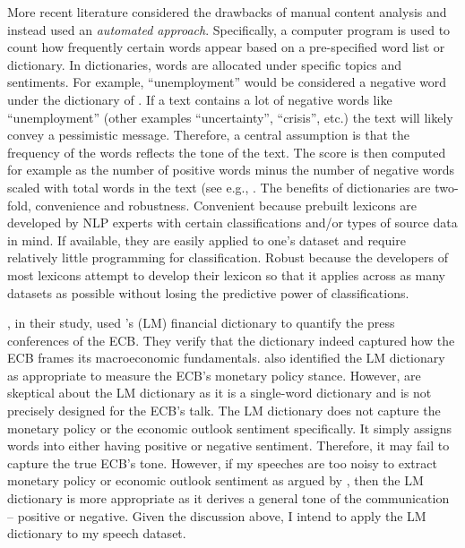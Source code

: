 More recent literature considered the drawbacks of manual content analysis and instead used an \textit{automated approach}. Specifically, a computer program is used to count how frequently certain words appear based on a pre-specified word list or dictionary. In dictionaries, words are allocated under specific topics and sentiments. For example, “unemployment” would be considered a negative word under the dictionary of \textcite{loughran2011}. If a text contains a lot of negative words like “unemployment” (other examples “uncertainty”, “crisis”, etc.) the text will likely convey a pessimistic message. Therefore, a central assumption is that the frequency of the words reflects the tone of the text. The score is then computed for example as the number of positive words minus the number of negative words scaled with total words in the text (see e.g., \cite{picault2017,baranowski2021}. The benefits of dictionaries are two-fold, convenience and robustness. Convenient because prebuilt lexicons are developed by NLP experts with certain classifications and/or types of source data in mind. If available, they are easily applied to one’s dataset and require relatively little programming for classification. Robust because the developers of most lexicons attempt to develop their lexicon so that it applies across as many datasets as possible without losing the predictive power of classifications.


\textcite{schmeling2019}, in their study, used \textcite{loughran2011}’s (LM) financial dictionary to quantify the press conferences of the ECB. They verify that the dictionary indeed captured how the ECB frames its macroeconomic fundamentals. \textcite{baranowski2021} also identified the LM dictionary as appropriate to measure the ECB’s monetary policy stance. However, \textcite{picault2017} are skeptical about the LM dictionary as it is a single-word dictionary and is not precisely designed for the ECB’s talk. The LM dictionary does not capture the monetary policy or the economic outlook sentiment specifically. It simply assigns words into either having positive or negative sentiment. Therefore, it may fail to capture the true ECB’s tone. However, if my speeches are too noisy to extract monetary policy or economic outlook sentiment as argued by \textcite{kohn2003}, then the LM dictionary is more appropriate as it derives a general tone of the communication – positive or negative. Given the discussion above, I intend to apply the LM dictionary to my speech dataset.


